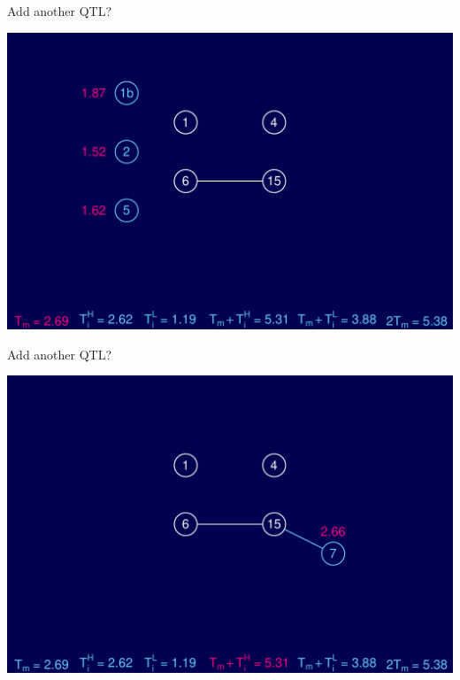\documentclass[12pt]{article}
\newcommand{\headsize}{\fontsize{35}{35} \selectfont}
\begin{document}
\newpage


\headsize \color{myyellow}
\hfill \begin{minipage}{5.75in}
\centering
Add another QTL?
\end{minipage}

\vfill


\centerline{\includegraphics{FigsB/hyper_models9.pdf}}



\newpage


\addtocounter{page}{-1}

\headsize \color{myyellow}
\hfill \begin{minipage}{5.75in}
\centering
Add another QTL?
\end{minipage}

\vfill


\centerline{\includegraphics{FigsB/hyper_models10.pdf}}
\end{document}
